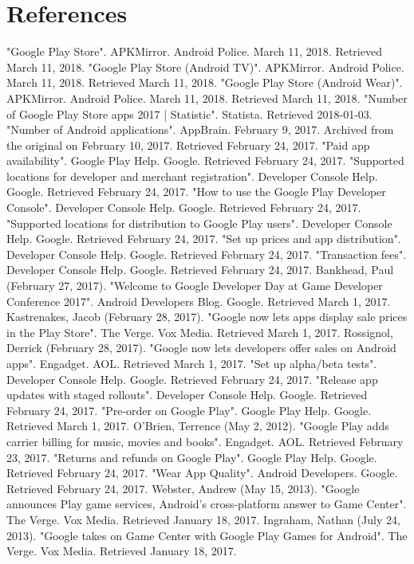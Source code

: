 \documentclass{article}                    %
\begin{document}
\section{ References}    
"Google Play Store". APKMirror. Android Police. March 11, 2018. Retrieved March 11, 2018.
"Google Play Store (Android TV)". APKMirror. Android Police. March 11, 2018. Retrieved March 11, 2018.
"Google Play Store (Android Wear)". APKMirror. Android Police. March 11, 2018. Retrieved March 11, 2018.
"Number of Google Play Store apps 2017 | Statistic". Statista. Retrieved 2018-01-03.
"Number of Android applications". AppBrain. February 9, 2017. Archived from the original on February 10, 2017. Retrieved February 24, 2017.
"Paid app availability". Google Play Help. Google. Retrieved February 24, 2017.
"Supported locations for developer and merchant registration". Developer Console Help. Google. Retrieved February 24, 2017.
"How to use the Google Play Developer Console". Developer Console Help. Google. Retrieved February 24, 2017.
"Supported locations for distribution to Google Play users". Developer Console Help. Google. Retrieved February 24, 2017.
"Set up prices and app distribution". Developer Console Help. Google. Retrieved February 24, 2017.
"Transaction fees". Developer Console Help. Google. Retrieved February 24, 2017.
Bankhead, Paul (February 27, 2017). "Welcome to Google Developer Day at Game Developer Conference 2017". Android Developers Blog. Google. Retrieved March 1, 2017.
Kastrenakes, Jacob (February 28, 2017). "Google now lets apps display sale prices in the Play Store". The Verge. Vox Media. Retrieved March 1, 2017.
Rossignol, Derrick (February 28, 2017). "Google now lets developers offer sales on Android apps". Engadget. AOL. Retrieved March 1, 2017.
"Set up alpha/beta tests". Developer Console Help. Google. Retrieved February 24, 2017.
"Release app updates with staged rollouts". Developer Console Help. Google. Retrieved February 24, 2017.
"Pre-order on Google Play". Google Play Help. Google. Retrieved March 1, 2017.
O'Brien, Terrence (May 2, 2012). "Google Play adds carrier billing for music, movies and books". Engadget. AOL. Retrieved February 23, 2017.
"Returns and refunds on Google Play". Google Play Help. Google. Retrieved February 24, 2017.
"Wear App Quality". Android Developers. Google. Retrieved February 24, 2017.
Webster, Andrew (May 15, 2013). "Google announces Play game services, Android's cross-platform answer to Game Center". The Verge. Vox Media. Retrieved January 18, 2017.
Ingraham, Nathan (July 24, 2013). "Google takes on Game Center with Google Play Games for Android". The Verge. Vox Media. Retrieved January 18, 2017.
\end{document}
